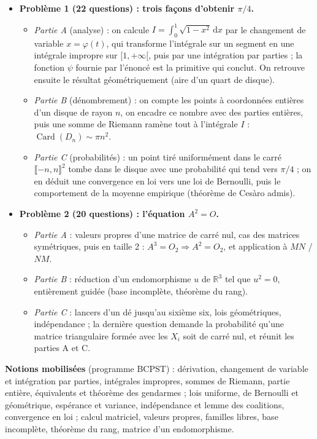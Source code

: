 \documentclass[11pt,a4paper]{article}
\providecommand{\tightlist}{\setlength{\itemsep}{0pt}\setlength{\parskip}{0pt}}
\providecommand{\llbracket}{\lBrack}
\providecommand{\rrbracket}{\rBrack}
\begin{document}
\begin{itemize}
\tightlist
\item
  \textbf{Problème 1 (22 questions) : trois façons d'obtenir \(\pi/4\).}

  \begin{itemize}
  \tightlist
  \item
    \emph{Partie A} (analyse) : on calcule \(I=\int_0^1\sqrt{1-x^2}\,\mathrm dx\) par le changement de variable \(x=\varphi(t)\), qui transforme l'intégrale sur un segment en une intégrale impropre sur \([1,+\infty[\), puis par une intégration par parties ; la fonction \(\psi\) fournie par l'énoncé est la primitive qui conclut. On retrouve ensuite le résultat géométriquement (aire d'un quart de disque).
  \item
    \emph{Partie B} (dénombrement) : on compte les points à coordonnées entières d'un disque de rayon \(n\), on encadre ce nombre avec des parties entières, puis une somme de Riemann ramène tout à l'intégrale \(I\) : \(\operatorname{Card}(D_n)\sim\pi n^2\).
  \item
    \emph{Partie C} (probabilités) : un point tiré uniformément dans le carré \(\llbracket-n,n\rrbracket^2\) tombe dans le disque avec une probabilité qui tend vers \(\pi/4\) ; on en déduit une convergence en loi vers une loi de Bernoulli, puis le comportement de la moyenne empirique (théorème de Cesàro admis).
  \end{itemize}
\item
  \textbf{Problème 2 (20 questions) : l'équation \(A^2=O\).}

  \begin{itemize}
  \tightlist
  \item
    \emph{Partie A} : valeurs propres d'une matrice de carré nul, cas des matrices symétriques, puis en taille 2 : \(A^3=O_2\Rightarrow A^2=O_2\), et application à \(MN\) / \(NM\).
  \item
    \emph{Partie B} : réduction d'un endomorphisme \(u\) de \(\mathbb R^3\) tel que \(u^2=0\), entièrement guidée (base incomplète, théorème du rang).
  \item
    \emph{Partie C} : lancers d'un dé jusqu'au sixième six, lois géométriques, indépendance ; la dernière question demande la probabilité qu'une matrice triangulaire formée avec les \(X_i\) soit de carré nul, et réunit les parties A et C.
  \end{itemize}
\end{itemize}

\textbf{Notions mobilisées} (programme BCPST) : dérivation, changement de variable et intégration par parties, intégrales impropres, sommes de Riemann, partie entière, équivalents et théorème des gendarmes ; lois uniforme, de Bernoulli et géométrique, espérance et variance, indépendance et lemme des coalitions, convergence en loi ; calcul matriciel, valeurs propres, familles libres, base incomplète, théorème du rang, matrice d'un endomorphisme.
\end{document}
